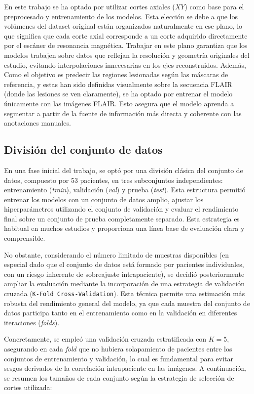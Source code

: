 \documentclass[../main.tex]{subfiles}
\begin{document}
En este trabajo se ha optado por utilizar cortes axiales ($XY$) como base para el preprocesado y entrenamiento de los modelos. Esta elección se debe a que los volúmenes del dataset original están organizados naturalmente en ese plano, lo que significa que cada corte axial corresponde a un corte adquirido directamente por el escáner de resonancia magnética. Trabajar en este plano garantiza que los modelos trabajen sobre datos que reflejan la resolución y geometría originales del estudio, evitando interpolaciones innecesarias en los ejes reconstruidos. Además, Como el objetivo es predecir las regiones lesionadas según las máscaras de referencia, y estas han sido definidas visualmente sobre la secuencia FLAIR (donde las lesiones se ven claramente), se ha optado por entrenar el modelo únicamente con las imágenes FLAIR. Esto asegura que el modelo aprenda a segmentar a partir de la fuente de información más directa y coherente con las anotaciones manuales.

\subsection{División del conjunto de datos}
En una fase inicial del trabajo, se optó por una división clásica del conjunto de datos, compuesto por 53 pacientes, en tres subconjuntos independientes: entrenamiento (\textit{train}), validación (\textit{val}) y prueba (\textit{test}). Esta estructura permitió entrenar los modelos con un conjunto de datos amplio, ajustar los hiperparámetros utilizando el conjunto de validación y evaluar el rendimiento final sobre un conjunto de prueba completamente separado. Esta estrategia es habitual en muchos estudios y proporciona una línea base de evaluación clara y comprensible.

No obstante, considerando el número limitado de muestras disponibles (en especial dado que el conjunto de datos está formado por pacientes individuales, con un riesgo inherente de sobreajuste intrapaciente), se decidió posteriormente ampliar la evaluación mediante la incorporación de una estrategia de validación cruzada (\texttt{K-Fold Cross-Validation}). Esta técnica permite una estimación más robusta del rendimiento general del modelo, ya que cada muestra del conjunto de datos participa tanto en el entrenamiento como en la validación en diferentes iteraciones (\textit{folds}).

Concretamente, se empleó una validación cruzada estratificada con $K=5$, asegurando en cada \textit{fold} que no hubiera solapamiento de pacientes entre los conjuntos de entrenamiento y validación, lo cual es fundamental para evitar sesgos derivados de la correlación intrapaciente en las imágenes. A continuación, se resumen los tamaños de cada conjunto según la estrategia de selección de cortes utilizada:
\end{document}

